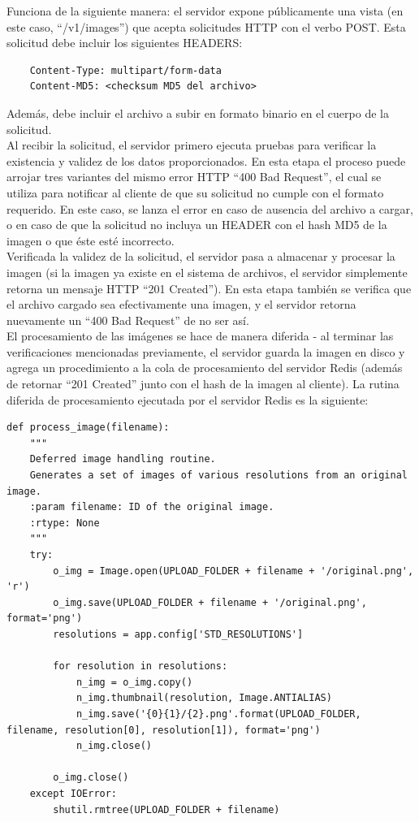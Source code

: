 \documentclass[11pt,letterpaper]{article}
\begin{document}
Funciona de la siguiente manera: el servidor expone públicamente una vista (en este caso, ``/v1/images'') que acepta solicitudes HTTP con el verbo POST. Esta solicitud debe incluir los siguientes HEADERS:
\begin{verbatim}
    Content-Type: multipart/form-data
    Content-MD5: <checksum MD5 del archivo>
\end{verbatim}
Además, debe incluir el archivo a subir en formato binario en el cuerpo de la solicitud. \\

Al recibir la solicitud, el servidor primero ejecuta pruebas para verificar la existencia y validez de los datos proporcionados. En esta etapa el proceso puede arrojar tres variantes del mismo error HTTP ``400 Bad Request'', el cual se utiliza para notificar al cliente de que su solicitud no cumple con el formato requerido. En este caso, se lanza el error en caso de ausencia del archivo a cargar, o en caso de que la solicitud no incluya un HEADER con el hash MD5 de la imagen o que éste esté incorrecto.\\
Verificada la validez de la solicitud, el servidor pasa a almacenar y procesar la imagen (si la imagen ya existe en el sistema de archivos, el servidor simplemente retorna un mensaje HTTP ``201 Created''). En esta etapa también se verifica que el archivo cargado sea efectivamente una imagen, y el servidor retorna nuevamente un ``400 Bad Request'' de no ser así.\\

El procesamiento de las imágenes se hace de manera diferida - al terminar las verificaciones mencionadas previamente, el servidor guarda la imagen en disco y agrega un procedimiento a la cola de procesamiento del servidor Redis (además de retornar ``201 Created'' junto con el hash de la imagen al cliente). La rutina diferida de procesamiento ejecutada por el servidor Redis es la siguiente:
\pagebreak
\begin{lstlisting}
def process_image(filename):
    """
    Deferred image handling routine.
    Generates a set of images of various resolutions from an original image.
    :param filename: ID of the original image.
    :rtype: None
    """
    try:
        o_img = Image.open(UPLOAD_FOLDER + filename + '/original.png', 'r')
        o_img.save(UPLOAD_FOLDER + filename + '/original.png', format='png')
        resolutions = app.config['STD_RESOLUTIONS']

        for resolution in resolutions:
            n_img = o_img.copy()
            n_img.thumbnail(resolution, Image.ANTIALIAS)
            n_img.save('{0}{1}/{2}.png'.format(UPLOAD_FOLDER, filename, resolution[0], resolution[1]), format='png')
            n_img.close()

        o_img.close()
    except IOError:
        shutil.rmtree(UPLOAD_FOLDER + filename)
\end{lstlisting}
\end{document}
